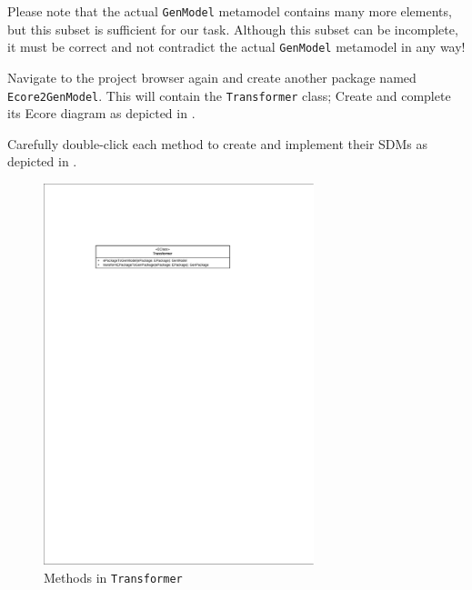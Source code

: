 \begin{stepbystep}
\vspace{0.5cm}

\item Please note that the actual \texttt{GenModel} metamodel contains many more elements, but this subset is sufficient for our
task.
Although this subset can be incomplete, it must be correct and not contradict the actual \texttt{GenModel} metamodel in any way!

\item Navigate to the project browser again and create another package named \texttt{Ecore2GenModel}.  
This will contain the \texttt{Transformer} class; Create and complete its Ecore diagram as depicted in .

\item Carefully double-click each method to create and implement their SDMs as depicted in .
\end{stepbystep}

\newpage

\vspace*{2cm}

\begin{figure}[htbp]
	\begin{center}  
	\includegraphics[width=0.7\textwidth]{../../org.moflon.doc.handbook.05_miscellaneous/3_existingEMF/emfImages/CDTransformer.pdf}
	\caption{Methods in \texttt{Transformer}}  
	\label{fig_e2gm}
	\end{center}
\end{figure} 

